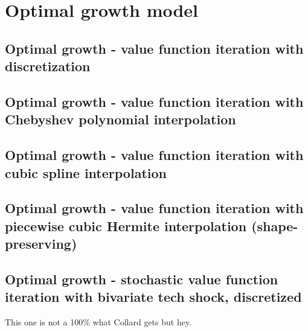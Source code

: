 \documentclass[11pt]{article}
\def \myFigPath {../../figures/}
\renewcommand{\[}{\begin{equation}}
\renewcommand{\]}{\end{equation}}
\begin{document}
\section{Optimal growth model}
\subsection{Optimal growth - value function iteration with discretization}
\begin{figure}[h!]
\end{figure}
\subsection{Optimal growth - value function iteration with Chebyshev polynomial interpolation}
\begin{figure}[h!]
\end{figure}
\newpage
\subsection{Optimal growth - value function iteration with cubic spline interpolation}
\begin{figure}[h!]
\end{figure}
\subsection{Optimal growth - value function iteration with piecewise cubic Hermite interpolation (shape-preserving)}
\begin{figure}[h!]
\end{figure}
\newpage
\subsection{Optimal growth - stochastic value function iteration with bivariate tech shock, discretized}
\begin{figure}[h!]
\end{figure}
This one is not a 100\% what Collard gets but hey.
\end{document}
